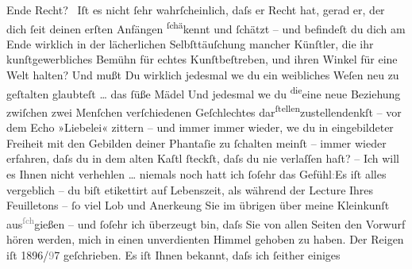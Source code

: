                Ende Recht? {\dotstwo} Iſt es nicht{ }ſehr wahrſcheinlich, daſs er
               Recht hat, gerad er, der dich{ }ſeit deinen erſten Anfängen \substVorne{}\textsuperscript{ſchä}\substDazwischen{}ke\substHinten{}nnt und{ }ſchätzt – und befindeſt du dich am Ende wirklich in der lächerlichen
               Selbſttäuſchung mancher {\pb}Künſtler, die ihr
               kunſtgewerbliches Bemühn für echtes Kunſtbeſtreben, und ihren Winkel für eine Welt
               halten? Und mußt Du wirklich jedesmal we{\geminationn} du ein
               weibliches Weſen neu zu geſtalten glaubteſt \label{T_L02988-4v}\label{T_L02988-4}{ }{\dots} das{ }ſüße Mädel {\dotstwo} Und jedesmal
                  we{\geminationn} du \substVorne{}\textsuperscript{die}\substDazwischen{}eine neue\substHinten{} Beziehung zwiſchen zwei Menſchen verſchiedenen Geſchlechtes dar\substVorne{}\textsuperscript{ſtellen}\substDazwischen{}zustellen\substHinten{}{ }{\pb}denkſt – vor dem Echo »Liebelei« zittern – und immer immer wieder, we{\geminationn} du in eingebildeter Freiheit mit den Gebilden deiner
               Phantaſie zu{ }ſchalten meinſt – immer wieder erfahren, daſs du in dem alten Kaſtl{ }ſteckſt, daſs du nie verlaſſen haſt? – Ich will es Ihnen nicht verhehlen {\dots} niemals noch hatt ich{ }ſoſehr das
                  Gefühl\textcolor{gray}{:}{\pb}Es iſt alles vergeblich – du biſt etikettirt
               auf Lebenszeit, als während der Lecture Ihres Feuilletons –{ }ſo viel Lob und Anerke{\geminationn}ung Sie im übrigen über meine Kleinkunſt aus\substVorne{}\textsuperscript{\textcolor{gray}{ſch}}\substDazwischen{}gi\substHinten{}eßen – und{ }ſoſehr ich überzeugt bin, daſs Sie von allen Seiten den Vorwurf
               hören werden, mich in einen unverdienten Himmel gehoben zu haben. Der Reigen iſt 1896/\textcolor{gray}{9}7 geſchrieben. Es iſt {\pb}Ihnen bekannt, daſs ich{ }ſeither einiges
